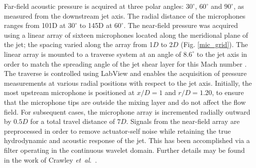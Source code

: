 \documentclass[english]{aiaa-tc}
\newcommand*{\etal}{\textit{et~al}.\ }
\begin{document}
Far-field acoustic pressure is acquired at three polar angles: $30^{\circ}$, $60^{\circ}$ and $90^{\circ}$, as measured from the downstream jet axis.
The radial distance of the microphones ranges from 101D at $30^{\circ}$ to 145D at $60^{\circ}$.
The near-field pressure was acquired using a linear array of sixteen microphones located along the meridional plane of the jet; the spacing varied along the array from 1$D$ to 2$D$ (Fig. \ref{mic_grid}).
The linear array is mounted to a traverse system at an angle of $8.6^{\circ}$ to the jet axis in order to match the spreading angle of the jet shear layer for this Mach number \cite{kfm2009-1}.
The traverse is controlled using LabView and enables the acquisition of pressure measurements at various radial positions with respect to the jet axis.
Initially, the most upstream microphone is positioned at $x/D = 1$ and $r/D = 1.20$, to ensure that the microphone tips are outside the mixing layer and do not affect the flow field.
For subsequent cases, the microphone array is incremented radially outward by $0.5D$ for a total travel distance of $7D$.
Signals from the near-field array are preprocessed in order to remove actuator-self noise while retaining the true hydrodynamic and acoustic response of the jet.
This has been accomplished via a filter operating in the continuous wavelet domain. Further details may be found in the work of Crawley \etal \cite{Crawley2015}.
\end{document}
